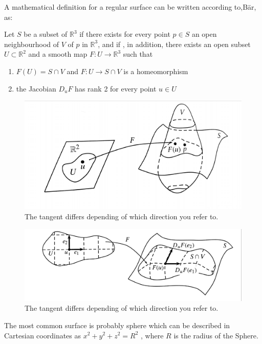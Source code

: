 A mathematical definition for a regular surface can be written according to,Bär, as:

\vspace{5mm} %

Let $S$  be a subset of $\mathbb{R}^3$ if there exists for every point $p \in S$ an open neighbourhood of $V$  of $p$ in $\mathbb{R}^3$, and if , in addition, there exists an open subset $U \subset \mathbb{R}^2$ and a smooth map $F:U \rightarrow \mathbb{R}^3$ such that
 
\begin{enumerate}
\item $ F(U) = S \cap V$  and $F:U \rightarrow S \cap V$ is a homeomorphism 
\item  the Jacobian $D_u F$ has rank 2 for every point $u \in U$  

\end{enumerate}


\begin{figure}[H]
\centering
\includegraphics[width=0.7\linewidth]{figure/Theory/surfdef.pdf}
 
\caption{The tangent differs depending of which direction you refer to. }
\end{figure}


\begin{figure}[H]
\centering
\includegraphics[width=0.8\linewidth]{figure/Theory/surffunction.pdf}
 
\caption{The tangent differs depending of which direction you refer to. }
\end{figure}




The most common surface is probably sphere which can be described in Cartesian coordinates as $ x^2 + y^2 + z^2 = R^2$ , where $R$ is the radius of the Sphere.

